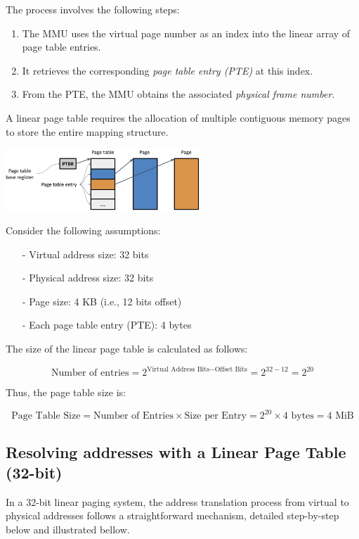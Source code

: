 The process involves the following steps:
\begin{enumerate}
    \item The MMU uses the virtual page number as an index into the linear array of page table entries.
    \item It retrieves the corresponding \emph{page table entry (PTE)} at this index.
    \item From the PTE, the MMU obtains the associated \emph{physical frame number}.
\end{enumerate}

A linear page table requires the allocation of multiple contiguous memory pages to store the entire mapping structure.

\begin{center}
  \includegraphics[width=0.55\textwidth]{chapters/L5/images/pte.png}
\end{center}

\begin{example}
Consider the following assumptions:
\begin{itemize}
  \item[-] Virtual address size: 32 bits
  \item[-] Physical address size: 32 bits
  \item[-] Page size: 4 KB (i.e., 12 bits offset)
  \item[-] Each page table entry (PTE): 4 bytes
\end{itemize}

The size of the linear page table is calculated as follows:

\[
\text{Number of entries} = 2^{\text{Virtual Address Bits} - \text{Offset Bits}} = 2^{32 - 12} = 2^{20}
\]

Thus, the page table size is:

\[
\text{Page Table Size} = \text{Number of Entries} \times \text{Size per Entry} = 2^{20} \times 4\text{ bytes} = 4\text{ MiB}
\]
\end{example}
\vfill
\newpage
\subsection{Resolving addresses with a Linear Page Table (32-bit)}
In a 32-bit linear paging system, the address translation process from virtual to physical addresses follows a straightforward mechanism, detailed step-by-step below and illustrated bellow. 

